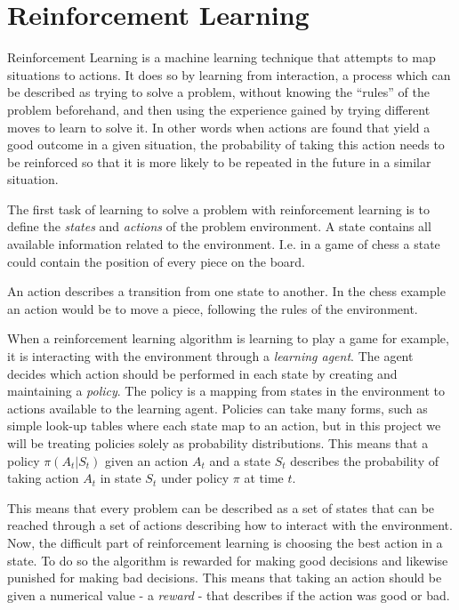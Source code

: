 \documentclass[11pt]{article}
\begin{document}
\maketitle

\section{Reinforcement Learning}

Reinforcement Learning is a machine learning technique that attempts 
to map situations to actions.
It does so by learning from interaction, a process which can be described as trying to solve a problem,
without knowing the “rules” of the problem beforehand,
and then using the experience gained by trying different moves to learn to solve it.
In other words when actions are found that yield a good outcome in a given situation,
the probability of taking this action needs to be reinforced so that it is more likely to be
repeated in the future in a similar situation.

The first task of learning to solve a problem with reinforcement learning is to define
the \textit{states} and \textit{actions} of the problem environment.
A state contains all available information related to the environment.
I.e. in a game of chess a state could contain the position of every piece on the board.

An action describes a transition from one state to another.
In the chess example an action would be to move a piece, following the rules of the
environment.

When a reinforcement learning algorithm is learning to play a game for example, it is
interacting with the environment through a \textit{learning agent}.
The agent decides which action should be performed in each state by creating and maintaining a \textit{policy}.
The policy is a mapping from states in the environment to actions available to the learning agent\cite{RLBook}.
Policies can take many forms, such as simple look-up tables where each state map to an
action, but in this project we will be treating policies solely as probability distributions.
This means that a policy $\pi(A_t|S_t)$ given an action $A_t$ and a state $S_t$ describes the
probability of taking action $A_t$ in state $S_t$ under policy $\pi$ at time $t$.

This means that every problem can be described as a set of states that can be reached
through a set of actions describing how to interact with the environment.
Now, the difficult part of reinforcement learning is choosing the best action in a
state.
To do so the algorithm is rewarded for making good decisions and likewise punished for making
bad decisions.
This means that taking an action should be given a numerical value
- a \textit{reward} - that describes if the action was good or bad.
\end{document}
